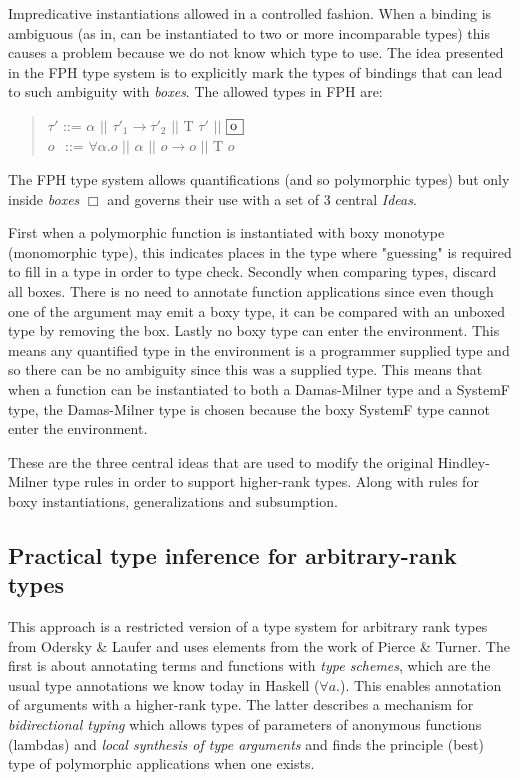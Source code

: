 Impredicative instantiations allowed in a controlled fashion. When a binding is ambiguous (as in, can be instantiated to two or more incomparable types) this causes a problem because we do not know which type to use. The idea presented in the FPH type system is to explicitly mark the types of bindings that can lead to such ambiguity with \textit{boxes}. The allowed types in FPH are:

\begin{quotation}
$\tau'$ ::= $\alpha$ $||$  $\tau'_1 \rightarrow \tau'_2$ $||$ T $\tau'$ $||$ $\framebox[0.45cm][l]{o}$ \\
\indent $o$ $\hspace{1pt}$ ::= $\forall \alpha.o$ $||$ $\alpha$ $||$ $o \rightarrow o$ $||$ T $o$
\end{quotation}

The FPH type system allows quantifications (and so polymorphic types) but only inside \emph{boxes} $\Box$ and governs their use with a set of 3 central \textit{Ideas}\cite{FPH}.

First when a polymorphic function is instantiated with boxy monotype (monomorphic type), this indicates places in the type where "guessing" is required to fill in a type in order to type check.
Secondly when comparing types, discard all boxes. There is no need to annotate function applications since even though one of the argument may emit a boxy type, it can be compared with an unboxed type by removing the box.
Lastly no boxy type can enter the environment. This means any quantified type in the environment is a programmer supplied type and so there can be no ambiguity since this was a supplied type. This means that when a function can be instantiated to both a Damas-Milner type and a SystemF type, the Damas-Milner type is chosen because the boxy SystemF type cannot enter the environment.

These are the three central ideas that are used to modify the original Hindley-Milner type rules in order to support higher-rank types. Along with rules for boxy instantiations, generalizations and subsumption.

\subsection{Practical type inference for arbitrary-rank types\cite{boring}}
This approach is a restricted version of a type system for arbitrary rank types from Odersky \& Laufer\cite{odesky} and uses elements from the work of Pierce \& Turner\cite{pierce}. The first is about annotating terms and functions with \textit{type schemes}, which are the usual type annotations we know today in Haskell ($\forall a.$). This enables annotation of arguments with a higher-rank type. The latter describes a mechanism for \textit{bidirectional typing} which allows types of parameters of anonymous functions (lambdas) and \textit{local synthesis of type arguments} and finds the principle (best) type of polymorphic applications when one exists.

